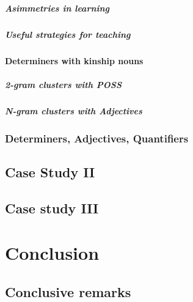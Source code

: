 \documentclass[
  a4paper,
  twoside,
  12pt,
  chapterprefix=false,
  bibliography=totocnumbered,
  listof=flat]{scrbook}
\begin{document}
\hypertarget{asimmetries-in-learning}{%
\subsubsection{Asimmetries in learning}\label{asimmetries-in-learning}}

\hypertarget{useful-strategies-for-teaching}{%
\subsubsection{Useful strategies for teaching}\label{useful-strategies-for-teaching}}

\hypertarget{determiners-with-kinship-nouns}{%
\subsection{Determiners with kinship nouns}\label{determiners-with-kinship-nouns}}

\hypertarget{gram-clusters-with-poss}{%
\subsubsection{2-gram clusters with POSS}\label{gram-clusters-with-poss}}

\hypertarget{n-gram-clusters-with-adjectives}{%
\subsubsection{N-gram clusters with Adjectives}\label{n-gram-clusters-with-adjectives}}

\hypertarget{determiners-adjectives-quantifiers}{%
\section{Determiners, Adjectives, Quantifiers}\label{determiners-adjectives-quantifiers}}

\hypertarget{case-study-ii}{%
\chapter{Case Study II}\label{case-study-ii}}

\hypertarget{case-study-iii}{%
\chapter{Case study III}\label{case-study-iii}}

\part{Conclusion}

\hypertarget{conclusive-remarks}{%
\chapter{Conclusive remarks}\label{conclusive-remarks}}

  
\end{document}

